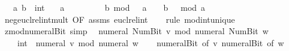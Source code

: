 \begin{isabellebody}
\ \ \ a\ b\ {\isacharcolon}{\kern0pt}{\isacharcolon}{\kern0pt}\ int\isanewline
\ \ \ {\isachardoublequoteopen}a\ {\isasymle}\ {}{\isachardoublequoteclose}\isanewline
\ \ \ {\isachardoublequoteopen}{\isacharparenleft}{\kern0pt}{}\ {\isacharplus}{\kern0pt}\ {}\ {\isacharasterisk}{\kern0pt}\ b{\isacharparenright}{\kern0pt}\ mod\ {\isacharparenleft}{\kern0pt}{}\ {\isacharasterisk}{\kern0pt}\ a{\isacharparenright}{\kern0pt}\ {\isacharequal}{\kern0pt}\ {}\ {\isacharasterisk}{\kern0pt}\ {\isacharparenleft}{\kern0pt}{\isacharparenleft}{\kern0pt}b\ {\isacharplus}{\kern0pt}\ {}{\isacharparenright}{\kern0pt}\ mod\ a{\isacharparenright}{\kern0pt}\ {\isacharminus}{\kern0pt}\ {}{\isachardoublequoteclose}\isanewline
%
\isadelimproof
\ \ %
\endisadelimproof
%
\isatagproof
{}\isamarkupfalse%
\ neg{\isacharunderscore}{\kern0pt}eucl{\isacharunderscore}{\kern0pt}rel{\isacharunderscore}{\kern0pt}int{\isacharunderscore}{\kern0pt}mult{\isacharunderscore}{\kern0pt}{}\ {\isacharbrackleft}{\kern0pt}OF\ assms\ eucl{\isacharunderscore}{\kern0pt}rel{\isacharunderscore}{\kern0pt}int{\isacharbrackright}{\kern0pt}\isanewline
\ \ \isamarkupfalse%
\ {\isacharparenleft}{\kern0pt}rule\ mod{\isacharunderscore}{\kern0pt}int{\isacharunderscore}{\kern0pt}unique{\isacharparenright}{\kern0pt}%
\endisatagproof
{\isafoldproof}%
%
\isadelimproof
\isanewline
%
\endisadelimproof
\isanewline
{}\isamarkupfalse%
\ zmod{\isacharunderscore}{\kern0pt}numeral{\isacharunderscore}{\kern0pt}Bit{}\ {\isacharbrackleft}{\kern0pt}simp{\isacharbrackright}{\kern0pt}{\isacharcolon}{\kern0pt}\isanewline
\ \ {\isachardoublequoteopen}numeral\ {\isacharparenleft}{\kern0pt}Num{\isachardot}{\kern0pt}Bit{}\ v{\isacharparenright}{\kern0pt}\ mod\ numeral\ {\isacharparenleft}{\kern0pt}Num{\isachardot}{\kern0pt}Bit{}\ w{\isacharparenright}{\kern0pt}\ {\isacharequal}{\kern0pt}\isanewline
\ \ \ \ {\isacharparenleft}{\kern0pt}{}{\isacharcolon}{\kern0pt}{\isacharcolon}{\kern0pt}int{\isacharparenright}{\kern0pt}\ {\isacharasterisk}{\kern0pt}\ {\isacharparenleft}{\kern0pt}numeral\ v\ mod\ numeral\ w{\isacharparenright}{\kern0pt}{\isachardoublequoteclose}\isanewline
%
\isadelimproof
\ \ %
\endisadelimproof
%
\isatagproof
{}\isamarkupfalse%
\ numeral{\isacharunderscore}{\kern0pt}Bit{}\ {\isacharbrackleft}{\kern0pt}of\ v{\isacharbrackright}{\kern0pt}\ numeral{\isacharunderscore}{\kern0pt}Bit{}\ {\isacharbrackleft}{\kern0pt}of\ w{\isacharbrackright}{\kern0pt}\isanewline

\end{isabellebody}
